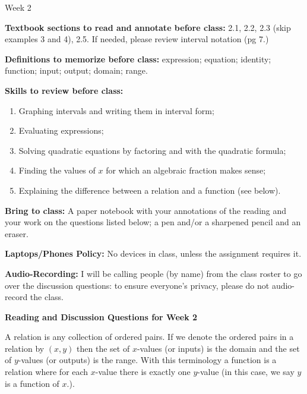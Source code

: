 \documentclass[12pt,dvipsnames]{article}
\begin{document}
\thispagestyle{empty}

	\begin{center}
		{\large{Week 2}}
	\end{center}

{\bfseries{Textbook sections to read and annotate before class:}}  2.1, 2.2, 2.3 (skip examples 3 and 4), 2.5. If needed, please review interval notation (pg 7.)
\smallskip

	{\bfseries{Definitions to memorize before class:}} expression; equation; identity; function; input; output; domain; range.
\smallskip	
	
{\bfseries{Skills to review before class:} }
	\begin{enumerate} 
		\item Graphing intervals and writing them in interval form;
		\item Evaluating expressions;
                     \item Solving quadratic equations by factoring and with the quadratic formula;
		\item Finding the values of $x$ for which an algebraic fraction makes sense;
		\item Explaining the difference between a relation and a function (see below).
\end{enumerate}
	
		
{\bfseries{Bring to class:} } A paper notebook with your annotations of the reading and your work on the questions listed below; a pen and/or a sharpened pencil and an eraser.

{\bfseries{Laptops/Phones Policy:}}  No devices in class, unless the assignment requires it.

{\bfseries{Audio-Recording:}} I will be calling people (by name) from the class roster to go over the discussion questions: to ensure everyone's privacy, please do not audio-record the class.


\begin{center}

{\large{\bfseries{Reading and Discussion Questions for Week 2} }}
\end{center}
A relation is any collection of ordered pairs. If we denote the ordered pairs in a relation by $(x,y)$ then the set of $x$-values (or inputs) is the domain and the set of $y$-values (or outputs) is the range. With this terminology a function is a relation where for each $x$-value there is exactly one $y$-value (in this case, we say $y$ is a function of $x$.).
\end{document}
